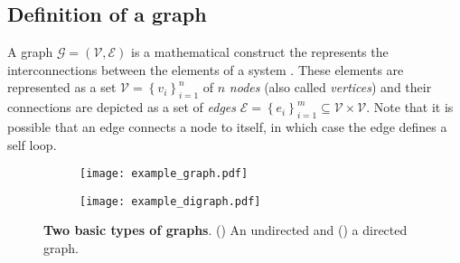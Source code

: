 \subsection{Definition of a graph}
A graph $\mathcal{G} = \left(\mathcal{V}, \mathcal{E}\right)$ is a mathematical construct the represents the interconnections between the elements of a system \cite{West2001Introductiongraphtheory}. These elements are represented as a set $ \mathcal{V}=\left\lbrace v_i\right\rbrace^n_{i=1}$ of $n$ \emph{nodes} (also called \emph{vertices}) and their connections are depicted as a set of \emph{edges} $ \mathcal{E}= \left\lbrace e_i\right\rbrace^m_{i=1} \subseteq \mathcal{V} \times \mathcal{V} $. Note that it is possible that an edge connects a node to itself, in which case the edge defines a self loop.
\begin{figure*}[!h]
	\centering	
	\hspace*{\fill}
	\begin{subfigure}[t]{0.32\textwidth}
		\subcaption{}
		\texttt{[image: example\_graph.pdf]}
		\label{fig:example_graph}
	\end{subfigure}	
	\hfill
	\begin{subfigure}[t]{0.32\textwidth}
		\subcaption{}
		\texttt{[image: example\_digraph.pdf]}
		\label{fig:example_digraph}
	\end{subfigure}
	\hspace*{\fill}	
	\caption[] {\label{fig:graph_examples} \textbf{Two basic types of graphs}. () An undirected and () a directed graph.}
\end{figure*}


